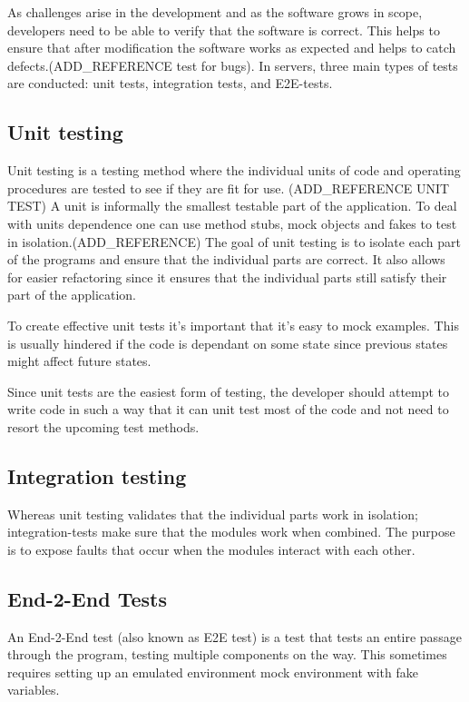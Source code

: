 As challenges arise in the development and as the software grows in scope,
developers need to be able to verify that the software is correct. This helps to
ensure that after modification the software works as expected and helps to catch
defects.(ADD\_REFERENCE test for bugs). In servers, three main types of tests
are conducted: unit tests, integration tests, and E2E-tests.

\subsection{Unit testing}

Unit testing is a testing method where the individual units of code and
operating procedures are tested to see if they are fit for use. (ADD\_REFERENCE
UNIT TEST) A unit is informally the smallest testable part of the application.
To deal with units dependence one can use method stubs, mock objects and fakes
to test in isolation.(ADD\_REFERENCE) The goal of unit testing is to isolate
each part of the programs and ensure that the individual parts are correct. It
also allows for easier refactoring since it ensures that the individual parts
still satisfy their part of the application.

To create effective unit tests it's important that it's easy to mock examples.
This is usually hindered if the code is dependant on some state since previous
states might affect future states.

Since unit tests are the easiest form of testing, the developer should attempt
to write code in such a way that it can unit test most of the code and not need
to resort the upcoming test methods.

\subsection{Integration testing}

Whereas unit testing validates that the individual parts work in isolation;
integration-tests make sure that the modules work when combined. The purpose is
to expose faults that occur when the modules interact with each other.

\subsection{End-2-End Tests}

An End-2-End test (also known as E2E test) is a test that tests an entire
passage through the program, testing multiple components on the way. This
sometimes requires setting up an emulated environment mock environment with fake
variables.

